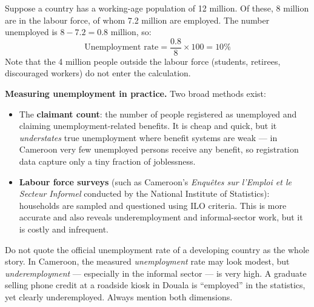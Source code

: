 \documentclass[11pt]{article}
\begin{document}
\begin{exemplebox}
Suppose a country has a working-age population of 12 million. Of these, 8 million are in the labour force, of whom 7.2 million are employed. The number unemployed is $8 - 7.2 = 0.8$ million, so:
\[
\text{Unemployment rate} = \frac{0.8}{8} \times 100 = 10\%
\]
Note that the 4 million people outside the labour force (students, retirees, discouraged workers) do not enter the calculation.
\end{exemplebox}

\textbf{Measuring unemployment in practice.} Two broad methods exist:
\begin{itemize}
\item The \textbf{claimant count}: the number of people registered as unemployed and claiming unemployment-related benefits. It is cheap and quick, but it \emph{understates} true unemployment where benefit systems are weak — in Cameroon very few unemployed persons receive any benefit, so registration data capture only a tiny fraction of joblessness.
\item \textbf{Labour force surveys} (such as Cameroon's \emph{Enquêtes sur l'Emploi et le Secteur Informel} conducted by the National Institute of Statistics): households are sampled and questioned using ILO criteria. This is more accurate and also reveals underemployment and informal-sector work, but it is costly and infrequent.
\end{itemize}

\begin{attention}
Do not quote the official unemployment rate of a developing country as the whole story. In Cameroon, the measured \emph{unemployment} rate may look modest, but \emph{underemployment} — especially in the informal sector — is very high. A graduate selling phone credit at a roadside kiosk in Douala is ``employed'' in the statistics, yet clearly underemployed. Always mention both dimensions.
\end{attention}
\end{document}
